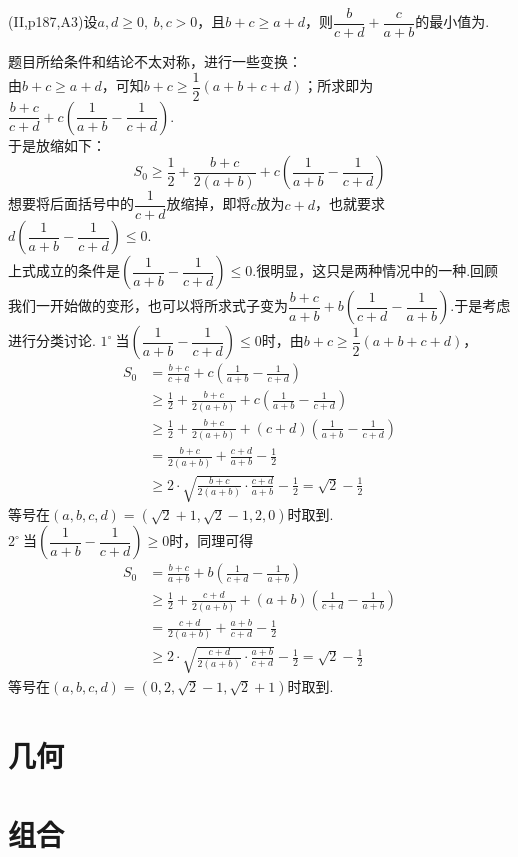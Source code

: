 \documentclass[cn,hazy,black,10pt,normal]{elegantnote}
\newenvironment{guess}{
  \color{guess}}{\newline \color{black}}
\newcommand{\tk}{\uline{\hspace{4em}}}
\newcommand{\ssb}[1]{\left( #1 \right)}
\newcommand{\buzhou}[1]{$#1^{\circ} \ $}
\begin{document}
\begin{problem}
	(II,p187,A3)设$a,d \geq 0,~b,c >0$，且$b+c \geq a+d$，则$\dfrac{b}{c+d}+\dfrac{c}{a+b}$的最小值为\tk .
\end{problem}
\begin{solution}
	\begin{guess}
		题目所给条件和结论不太对称，进行一些变换： \\
		由$b+c \geq a+d$，可知$b+c \geq \dfrac{1}{2}(a+b+c+d)$；所求即为$\dfrac{b+c}{c+d}+c\ssb{\dfrac{1}{a+b}-\dfrac{1}{c+d}}$. \\
		于是放缩如下：$$S_0 \geq \dfrac{1}{2}+\dfrac{b+c}{2(a+b)} + c\ssb{\dfrac{1}{a+b}-\dfrac{1}{c+d}}$$
		想要将后面括号中的$\dfrac{1}{c+d}$放缩掉，即将$c$放为$c+d$，也就要求$d\ssb{\dfrac{1}{a+b}-\dfrac{1}{c+d}} \leq 0$. \\
		上式成立的条件是$\ssb{\dfrac{1}{a+b}-\dfrac{1}{c+d}} \leq 0$.很明显，这只是两种情况中的一种.回顾我们一开始做的变形，也可以将所求式子变为$\dfrac{b+c}{a+b} + b\ssb{\dfrac{1}{c+d}-\dfrac{1}{a+b}}$.于是考虑进行分类讨论.
	\end{guess}
	\buzhou{1}当$\ssb{\dfrac{1}{a+b}-\dfrac{1}{c+d}} \leq 0$时，由$b+c \geq \dfrac{1}{2}(a+b+c+d)$，
	\begin{align*}
		S_0 &= \frac{b+c}{c+d}+c\ssb{\frac{1}{a+b}-\frac{1}{c+d}} \\
		&\geq \frac{1}{2}+\frac{b+c}{2(a+b)} + c\ssb{\frac{1}{a+b}-\frac{1}{c+d}} \\
		&\geq \frac{1}{2}+\frac{b+c}{2(a+b)} + (c+d)\ssb{\frac{1}{a+b}-\frac{1}{c+d}} \\
		&= \frac{b+c}{2(a+b)} + \frac{c+d}{a+b} - \frac{1}{2} \\
		&\geq 2\cdot \sqrt{\frac{b+c}{2(a+b)} \cdot \frac{c+d}{a+b}} - \frac{1}{2} = \sqrt{2} - \frac{1}{2}
	\end{align*}
	等号在$(a,b,c,d)=(\sqrt{2}+1,\sqrt{2}-1,2,0)$时取到. \\
	\buzhou{2}当$\ssb{\dfrac{1}{a+b}-\dfrac{1}{c+d}} \geq 0$时，同理可得
	\begin{align*}
		S_0 &= \frac{b+c}{a+b} + b\ssb{\frac{1}{c+d}-\frac{1}{a+b}} \\
		&\geq \frac{1}{2} + \frac{c+d}{2(a+b)} + (a+b)\ssb{\frac{1}{c+d}-\frac{1}{a+b}} \\
		&= \frac{c+d}{2(a+b)} + \frac{a+b}{c+d} - \frac{1}{2} \\
		&\geq 2\cdot \sqrt{\frac{c+d}{2(a+b)} \cdot \frac{a+b}{c+d}} - \frac{1}{2} = \sqrt{2} - \frac{1}{2}
	\end{align*}
	等号在$(a,b,c,d)=(0,2,\sqrt{2}-1,\sqrt{2}+1)$时取到.
\end{solution}

\chapter{几何}

\chapter{组合}
\end{document}
